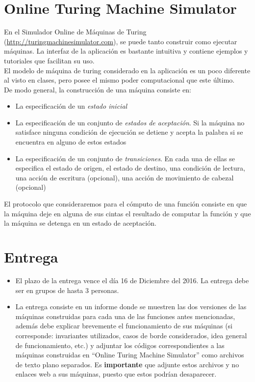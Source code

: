 \documentclass[dcc]{fcfmcourse}
\begin{document}
\section*{Online Turing Machine Simulator}
En el Simulador Online de Máquinas de Turing (\url{http://turingmachinesimulator.com}), se puede tanto construir como ejecutar máquinas. La interfaz de la aplicación es bastante intuitiva y contiene ejemplos y tutoriales que facilitan su uso.\\

El modelo de máquina de turing considerado en la aplicación es un poco diferente al visto en clases, pero posee el mismo poder computacional que este último.\\

De modo general, la construcción de una máquina consiste en:
\begin{itemize}
    \item La especificación de un \textit{estado inicial}
    \item La especificación de un conjunto de \textit{estados de aceptación}. Si la máquina no satisface ninguna condición de ejecución se detiene y acepta la palabra si se encuentra en alguno de estos estados
    \item La especificación de un conjunto de \textit{transiciones}. En cada una de ellas se especifica el estado de origen, el estado de destino, una condición de lectura, una acción de escritura (opcional), una acción de movimiento de cabezal (opcional)
\end{itemize}
El protocolo que consideraremos para el cómputo de una función consiste en que la máquina deje en alguna de sus cintas el resultado de computar la función y que la máquina se detenga en un estado de aceptación.
\section*{Entrega}
\begin{itemize}
\item El plazo de la entrega vence el día 16 de Diciembre del 2016. La entrega debe ser en grupos de hasta 3 personas.
\item La entrega consiste en un informe donde se muestren las dos versiones de las máquinas construidas para cada una de las funciones antes mencionadas, además debe explicar brevemente el funcionamiento de sus máquinas (si corresponde: invariantes utilizados, casos de borde considerados, idea general de funcionamiento, etc.) y adjuntar los códigos correspondientes a las máquinas construidas en ``Online Turing Machine Simulator'' como archivos de texto plano separados. Es \textbf{importante} que adjunte estos archivos y no enlaces web a sus máquinas, puesto que estos podrían desaparecer.
\end{itemize}
\end{document}

